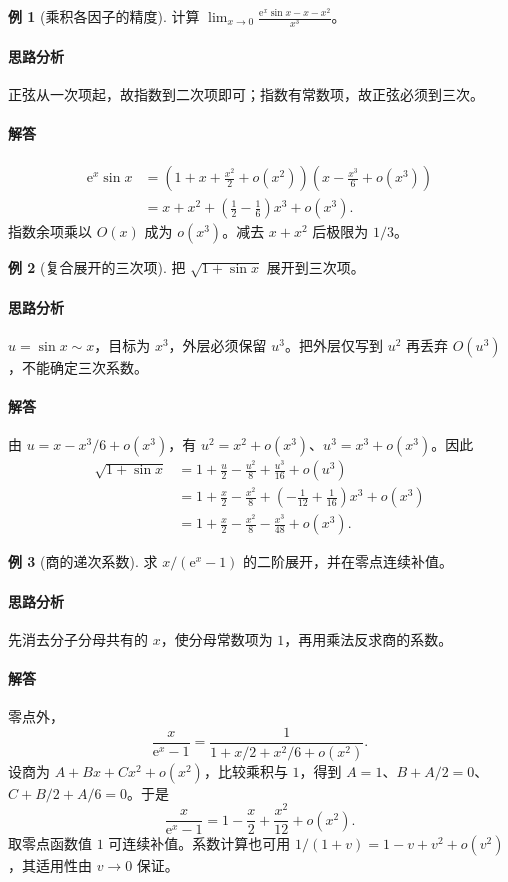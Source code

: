 \documentclass[UTF8,fontset=fandol,12pt,oneside,openany]{ctexrep}
\newcommand{\ee}{\mathrm e}
\theoremstyle{definition}
\newtheorem{example}{例}[chapter]
\begin{document}
\begin{example}[乘积各因子的精度]计算 $\displaystyle\lim_{x\to0}\frac{\ee^x\sin x-x-x^2}{x^3}$。\end{example}
\paragraph{思路分析}正弦从一次项起，故指数到二次项即可；指数有常数项，故正弦必须到三次。
\paragraph{解答}
\begin{align*}
\ee^x\sin x
&=\left(1+x+\frac{x^2}2+o(x^2)\right)
\left(x-\frac{x^3}6+o(x^3)\right)\\
&=x+x^2+\left(\frac12-\frac16\right)x^3+o(x^3).
\end{align*}
指数余项乘以 $O(x)$ 成为 $o(x^3)$。减去 $x+x^2$ 后极限为 $1/3$。

\begin{example}[复合展开的三次项]把 $\sqrt{1+\sin x}$ 展开到三次项。\end{example}
\paragraph{思路分析}$u=\sin x\sim x$，目标为 $x^3$，外层必须保留 $u^3$。把外层仅写到 $u^2$ 再丢弃 $O(u^3)$，不能确定三次系数。
\paragraph{解答}由 $u=x-x^3/6+o(x^3)$，有 $u^2=x^2+o(x^3)$、$u^3=x^3+o(x^3)$。因此
\begin{align*}
\sqrt{1+\sin x}
&=1+\frac u2-\frac{u^2}8+\frac{u^3}{16}+o(u^3)\\
&=1+\frac x2-\frac{x^2}8+\left(-\frac1{12}+\frac1{16}\right)x^3+o(x^3)\\
&=1+\frac x2-\frac{x^2}8-\frac{x^3}{48}+o(x^3).
\end{align*}

\begin{example}[商的递次系数]求 $x/(\ee^x-1)$ 的二阶展开，并在零点连续补值。\end{example}
\paragraph{思路分析}先消去分子分母共有的 $x$，使分母常数项为 $1$，再用乘法反求商的系数。
\paragraph{解答}零点外，
\[
\frac{x}{\ee^x-1}=\frac1{1+x/2+x^2/6+o(x^2)}.
\]
设商为 $A+Bx+Cx^2+o(x^2)$，比较乘积与 $1$，得到 $A=1$、$B+A/2=0$、$C+B/2+A/6=0$。于是
\[
\frac{x}{\ee^x-1}=1-\frac x2+\frac{x^2}{12}+o(x^2).
\]
取零点函数值 $1$ 可连续补值。系数计算也可用 $1/(1+v)=1-v+v^2+o(v^2)$，其适用性由 $v\to0$ 保证。
\end{document}
